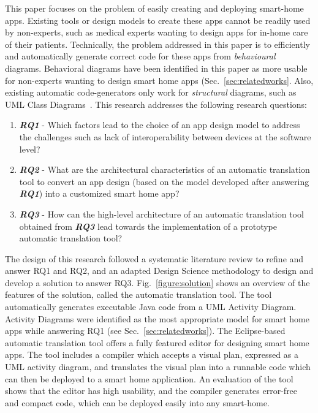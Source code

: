 This paper focuses on the problem of easily creating and deploying smart-home apps. Existing tools or design models to create these apps cannot be readily used by non-experts, such as medical experts wanting to design apps for in-home care of their patients. Technically, the problem addressed in this paper is to efficiently and automatically generate correct code for these apps from \textit{behavioural} diagrams. Behavioral diagrams have been identified in this paper as more usable for non-experts wanting to design smart home apps (Sec.~\ref{sec:relatedworks}.
Also, existing automatic code-generators only work for \textit{structural} diagrams, such as UML Class Diagrams~\cite{rumpe2016modeling}.
This research addresses the following research questions:

\begin{enumerate}
\item \textbf{\textit{RQ1}} - Which factors lead to the choice of an app design model to address the challenges such as lack of interoperability between devices at the software level? 
\item \textbf{\textit{RQ2}} - What are the architectural characteristics of an automatic translation tool to convert an app design (based on the model developed after answering \textit{\textbf{RQ1}}) into a customized smart home app?
\item \textbf{\textit{RQ3}} - How can the high-level architecture of an automatic translation tool obtained from \textit{\textbf{RQ3}} lead towards the implementation of a prototype automatic translation tool?
\end{enumerate}




The design of this research followed a systematic literature review to refine and answer RQ1 and RQ2, and an adapted Design Science methodology to design and develop a solution to answer RQ3.
Fig.~\ref{figure:solution} shows an overview of the features of the solution, called the automatic translation tool. 
The tool automatically generates executable Java code from a UML Activity Diagram.
Activity Diagrams were identified as the most appropriate model for smart home apps while answering RQ1 (see Sec.~\ref{sec:relatedworks}).
The Eclipse-based automatic translation tool offers a fully featured editor for designing smart home apps.
The tool includes a compiler which accepts a visual plan, expressed as a UML activity diagram, and translates the visual plan into a runnable code which can then be deployed to a smart home application. 
An evaluation of the tool shows that the editor has high usability, and the compiler generates error-free and compact code, which can be deployed easily into any smart-home. 



